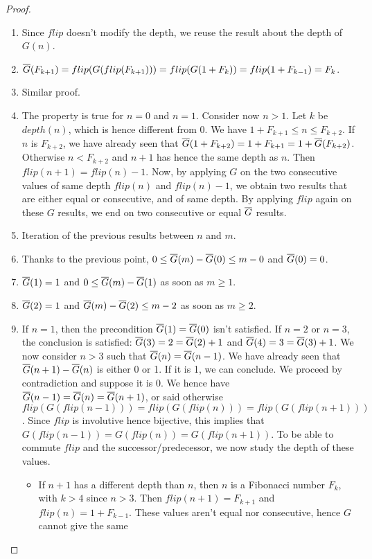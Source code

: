\documentclass[a4paper,11pt]{article}
\begin{document}
\begin{proof}
\noindent
\begin{enumerate}
\item Since $flip$ doesn't modify the depth, we reuse the
result about the depth of $G(n)$.
\item $\overline{G}(F_{k+1}) = flip(G(flip(F_{k+1}))) = flip(G(1+F_k)) =
       flip(1+F_{k-1}) = F_k$.
\item Similar proof.
\item The property is true for $n=0$ and $n=1$.
Consider now $n>1$. Let $k$ be $depth(n)$, which is
hence different from 0. We have $1+F_{k+1} \le n \le F_{k+2}$.
If $n$ is $F_{k+2}$, we have already seen that
$\overline{G}(1+F_{k+2}) = 1+F_{k+1} = 1+\overline{G}(F_{k+2})$. Otherwise $n < F_{k+2}$
and $n+1$ has hence the same depth as $n$. Then
$flip(n+1)=flip(n)-1$. Now, by applying $G$ on the two consecutive values
of same depth $flip(n)$ and $flip(n)-1$, we obtain two results that
are either equal or consecutive, and of same depth. By applying $flip$
again on these $G$ results, we end on two consecutive or equal
$\overline{G}$ results.
\item Iteration of the previous results between $n$ and $m$.
\item Thanks to the previous point, $0 \le \overline{G}(m)-\overline{G}(0) \le m-0$
and $\overline{G}(0)=0$.
\item $\overline{G}(1)=1$ and $0 \le \overline{G}(m)-\overline{G}(1)$ as soon as $m\ge 1$.
\item $\overline{G}(2)=1$ and $\overline{G}(m)-\overline{G}(2) \le m-2$ as soon as $m \ge 2$.
\item If $n=1$, then the precondition $\overline{G}(1)=\overline{G}(0)$ isn't
  satisfied. If $n=2$ or $n=3$, the conclusion is satisfied:
  $\overline{G}(3)=2=\overline{G}(2)+1$ and $\overline{G}(4)=3=\overline{G}(3)+1$.
  We now consider $n>3$ such that
  $\overline{G}(n)=\overline{G}(n-1)$. We have already seen that $\overline{G}(n+1)-\overline{G}(n)$
  is either 0 or 1. If it is 1, we can conclude. We proceed by
  contradiction and suppose it is 0. We hence have
  $\overline{G}(n-1)=\overline{G}(n)=\overline{G}(n+1)$, or said otherwise
  $flip(G(flip(n-1))) = flip(G(flip(n))) = flip(G(flip(n+1)))$.
  Since $flip$ is involutive hence bijective, this implies that
  $G(flip(n-1))=G(flip(n))=G(flip(n+1))$. To be able to commute
  $flip$ and the successor/predecessor, we now study the depth
  of these values.
  \begin{itemize}
  \item If $n+1$ has a different depth than $n$, then
    $n$ is a Fibonacci number $F_{k}$, with $k>4$ since $n>3$.
    Then $flip(n+1)=F_{k+1}$ and $flip(n)=1+F_{k-1}$. These values
    aren't equal nor consecutive, hence $G$ cannot give the same

\end{itemize}
\end{enumerate}
\end{proof}
\end{document}
